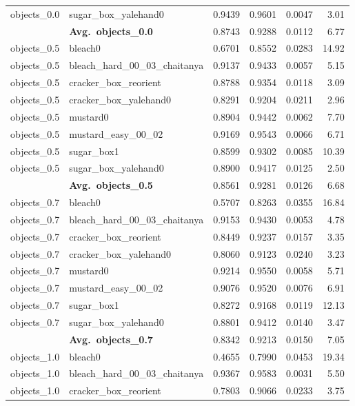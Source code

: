 \begin{longtable}{llrrrr}
  objects_0.0 & sugar\_box\_yalehand0 & 0.9439 & 0.9601 & 0.0047 & 3.01 \\
  \cmidrule{2-6}
  & \textbf{Avg.~objects_0.0} & 0.8743 & 0.9288 & 0.0112 & 6.77 \\
  \midrule
  objects_0.5 & bleach0 & 0.6701 & 0.8552 & 0.0283 & 14.92 \\
  objects_0.5 & bleach\_hard\_00\_03\_chaitanya & 0.9137 & 0.9433 & 0.0057 & 5.15 \\
  objects_0.5 & cracker\_box\_reorient & 0.8788 & 0.9354 & 0.0118 & 3.09 \\
  objects_0.5 & cracker\_box\_yalehand0 & 0.8291 & 0.9204 & 0.0211 & 2.96 \\
  objects_0.5 & mustard0 & 0.8904 & 0.9442 & 0.0062 & 7.70 \\
  objects_0.5 & mustard\_easy\_00\_02 & 0.9169 & 0.9543 & 0.0066 & 6.71 \\
  objects_0.5 & sugar\_box1 & 0.8599 & 0.9302 & 0.0085 & 10.39 \\
  objects_0.5 & sugar\_box\_yalehand0 & 0.8900 & 0.9417 & 0.0125 & 2.50 \\
  \cmidrule{2-6}
  & \textbf{Avg.~objects_0.5} & 0.8561 & 0.9281 & 0.0126 & 6.68 \\
  \midrule
  objects_0.7 & bleach0 & 0.5707 & 0.8263 & 0.0355 & 16.84 \\
  objects_0.7 & bleach\_hard\_00\_03\_chaitanya & 0.9153 & 0.9430 & 0.0053 & 4.78 \\
  objects_0.7 & cracker\_box\_reorient & 0.8449 & 0.9237 & 0.0157 & 3.35 \\
  objects_0.7 & cracker\_box\_yalehand0 & 0.8060 & 0.9123 & 0.0240 & 3.23 \\
  objects_0.7 & mustard0 & 0.9214 & 0.9550 & 0.0058 & 5.71 \\
  objects_0.7 & mustard\_easy\_00\_02 & 0.9076 & 0.9520 & 0.0076 & 6.91 \\
  objects_0.7 & sugar\_box1 & 0.8272 & 0.9168 & 0.0119 & 12.13 \\
  objects_0.7 & sugar\_box\_yalehand0 & 0.8801 & 0.9412 & 0.0140 & 3.47 \\
  \cmidrule{2-6}
  & \textbf{Avg.~objects_0.7} & 0.8342 & 0.9213 & 0.0150 & 7.05 \\
  \midrule
  objects_1.0 & bleach0 & 0.4655 & 0.7990 & 0.0453 & 19.34 \\
  objects_1.0 & bleach\_hard\_00\_03\_chaitanya & 0.9367 & 0.9583 & 0.0031 & 5.50 \\
  objects_1.0 & cracker\_box\_reorient & 0.7803 & 0.9066 & 0.0233 & 3.75 \\

\end{longtable}
